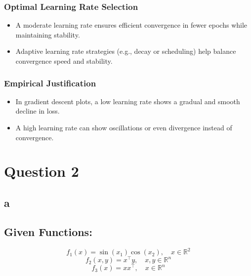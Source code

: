\documentclass{article}
\begin{document}
\subsubsection{Optimal Learning Rate Selection}
\begin{itemize}
    \item A moderate learning rate ensures efficient convergence in fewer epochs while maintaining stability.
    \item Adaptive learning rate strategies (e.g., decay or scheduling) help balance convergence speed and stability.
\end{itemize}

\subsubsection{Empirical Justification}
\begin{itemize}
    \item In gradient descent plots, a low learning rate shows a gradual and smooth decline in loss.
    \item A high learning rate can show oscillations or even divergence instead of convergence.
\end{itemize}














\section{Question 2}
\subsection{a}
\subsection*{Given Functions:}
\[
f_1(x) = \sin(x_1) \cos(x_2), \quad x \in \mathbb{R}^2
\]
\[
f_2(x, y) = x^\top y, \quad x, y \in \mathbb{R}^n
\]
\[
f_3(x) = xx^\top, \quad x \in \mathbb{R}^n
\]
\end{document}
